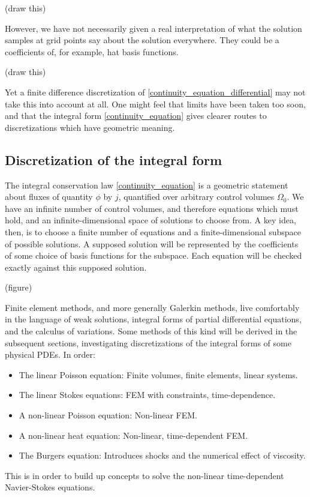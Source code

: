 \vskip 0.2in
(draw this)
\vskip 0.2in

However, we have not necessarily given a real interpretation of what the solution samples at grid points say about the solution everywhere.
They could be a coefficients of, for example, hat basis functions.

\vskip 0.2in
(draw this)
\vskip 0.2in

Yet a finite difference discretization of \eqref{continuity_equation_differential} may not take this into account at all. One might feel that
limits have been taken too soon, and that the integral form \eqref{continuity_equation} gives clearer routes to discretizations which
have geometric meaning.

\subsection{Discretization of the integral form}
The integral conservation law \eqref{continuity_equation} is a geometric statement about fluxes
of quantity $\phi$ by $j$, quantified over arbitrary control volumes $\Omega_0$.
We have an infinite number of control volumes, and therefore equations which must hold, and an infinite-dimensional
space of solutions to choose from. A key idea, then, is to choose a finite number of equations and a finite-dimensional subspace of possible solutions.
A supposed solution will be represented by the coefficients of some choice of basis functions for the subspace. Each equation will be checked exactly against this supposed solution.

\vskip 0.2in
(figure)
\vskip 0.2in

Finite element methods, and more generally Galerkin methods, live comfortably in the language of weak solutions, integral forms of partial differential equations,
and the calculus of variations. Some methods of this kind will be derived in the subsequent sections, investigating discretizations of the integral forms
of some physical PDEs. In order:
\begin{itemize}
    \item The linear Poisson equation: Finite volumes, finite elements, linear systems.
    \item The linear Stokes equations: FEM with constraints, time-dependence.
    \item A non-linear Poisson equation: Non-linear FEM.
    \item A non-linear heat equation: Non-linear, time-dependent FEM.
    \item The Burgers equation: Introduces shocks and the numerical effect of viscosity.
\end{itemize}
This is in order to build up concepts to solve the non-linear time-dependent Navier-Stokes equations.

